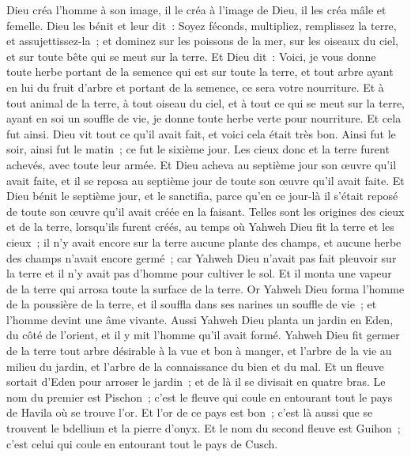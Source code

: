 \begin{multicols}{2}
Dieu créa l'homme à son image, il le créa à l'image de Dieu, il les créa mâle et femelle.
Dieu les bénit et leur dit~: Soyez féconds, multipliez, remplissez la terre, et assujettissez-la~; et dominez sur les poissons de la mer, sur les oiseaux du ciel, et sur toute bête qui se meut sur la terre.
Et Dieu dit~: Voici, je vous donne toute herbe portant de la semence qui est sur toute la terre, et tout arbre ayant en lui du fruit d'arbre et portant de la semence, ce sera votre nourriture.
Et à tout animal de la terre, à tout oiseau du ciel, et à tout ce qui se meut sur la terre, ayant en soi un souffle de vie, je donne toute herbe verte pour nourriture. Et cela fut ainsi.
Dieu vit tout ce qu'il avait fait, et voici cela était très bon. Ainsi fut le soir, ainsi fut le matin~; ce fut le sixième jour.
\VerseOne{}Les cieux donc et la terre furent achevés, avec toute leur armée.
Et Dieu acheva au septième jour son œuvre qu'il avait faite, et il se reposa au septième jour de toute son œuvre qu'il avait faite.
Et Dieu bénit le septième jour, et le sanctifia, parce qu'en ce jour-là il s'était reposé de toute son œuvre qu'il avait créée en la faisant.
Telles sont les origines des cieux et de la terre, lorsqu'ils furent créés, au temps où Yahweh Dieu fit la terre et les cieux~;
il n'y avait encore sur la terre aucune plante des champs, et aucune herbe des champs n'avait encore germé~; car Yahweh Dieu n'avait pas fait pleuvoir sur la terre et il n'y avait pas d'homme pour cultiver le sol.
Et il monta une vapeur de la terre qui arrosa toute la surface de la terre.
Or Yahweh Dieu forma l'homme de la poussière de la terre, et il souffla dans ses narines un souffle de vie~; et l'homme devint une âme vivante.
Aussi Yahweh Dieu planta un jardin en Eden, du côté de l'orient, et il y mit l'homme qu'il avait formé.
Yahweh Dieu fit germer de la terre tout arbre désirable à la vue et bon à manger, et l'arbre de la vie au milieu du jardin, et l'arbre de la connaissance du bien et du mal.
Et un fleuve sortait d'Eden pour arroser le jardin~; et de là il se divisait en quatre bras.
Le nom du premier est Pischon~; c'est le fleuve qui coule en entourant tout le pays de Havila où se trouve l'or.
Et l'or de ce pays est bon~; c'est là aussi que se trouvent le bdellium et la pierre d'onyx.
Et le nom du second fleuve est Guihon~; c'est celui qui coule en entourant tout le pays de Cusch.

\end{multicols}
